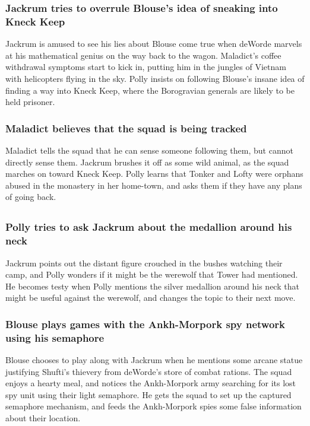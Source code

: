 \subsubsection{\Gls{Jackrum} tries to overrule \Gls{Blouse}'s idea of sneaking into Kneck Keep}
\Gls{Jackrum} is amused to see his lies about \Gls{Blouse} come true when \Gls{deWorde} marvels at
his mathematical genius on the way back to the wagon. \Gls{Maladict}'s coffee withdrawal symptoms
start to kick in, putting him in the jungles of Vietnam with helicopters flying in the sky.
\Gls{Polly} insists on following \Gls{Blouse}'s insane idea of finding a way into Kneck Keep, where
the Borogravian generals are likely to be held prisoner.

\subsubsection{\Gls{Maladict} believes that the squad is being tracked}
\Gls{Maladict} tells the squad that he can sense someone following them, but cannot directly sense
them. \Gls{Jackrum} brushes it off as some wild animal, as the squad marches on toward Kneck Keep.
\Gls{Polly} learns that \Gls{Tonker} and \Gls{Lofty} were orphans abused in the monastery in her
home-town, and asks them if they have any plans of going back.

\subsection{}
\subsubsection{\Gls{Polly} tries to ask \Gls{Jackrum} about the medallion around his neck}
\Gls{Jackrum} points out the distant figure crouched in the bushes watching their camp, and
\Gls{Polly} wonders if it might be the werewolf that \Gls{Tower} had mentioned. He becomes testy
when \Gls{Polly} mentions the silver medallion around his neck that might be useful against the
werewolf, and changes the topic to their next move.

\subsubsection{\Gls{Blouse} plays games with the Ankh-Morpork spy network using his semaphore}
\Gls{Blouse} chooses to play along with \Gls{Jackrum} when he mentions some arcane statue justifying
\Gls{Shufti}'s thievery from \Gls{deWorde}'s store of combat rations. The squad enjoys a hearty
meal, and notices the Ankh-Morpork army searching for its lost spy unit using their light semaphore.
He gets the squad to set up the captured semaphore mechanism, and feeds the Ankh-Morpork spies some
false information about their location.

